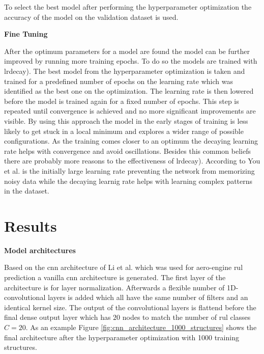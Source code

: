 \documentclass[conference]{IEEEtran}
\begin{document}
To select the best model after performing the hyperparameter optimization the accuracy of the model on the validation dataset is used.

\noindent
\textbf{Fine Tuning}

After the optimum parameters for a model are found the model can be further improved by running more training epochs. To do so the models are trained with \gls{lrdecay)}. The best model from the hyperparameter optimization is taken and trained for a predefined number of epochs on the learning rate which was identified as the best one on the optimization. The learning rate is then lowered before the model is trained again for a fixed number of epochs. This step is repeated until convergence is achieved and no more significant improvements are visible. By using this approach the model in the early stages of training is less likely to get stuck in a local minimum and explores a wider range of possible configurations. As the training comes closer to an optimum the decaying learning rate helps with convergence and avoid oscillations. Besides this common beliefs there are probably more reasons to the effectiveness of \gls{lrdecay)}. According to You et al. \cite{You2019} is the initially large learning rate preventing the network from memorizing noisy data while the decaying learnig rate helps with learning complex patterns in the dataset.


\section{Results}
\label{sec:results}


\noindent
\textbf{Model architectures}

Based on the \gls{cnn} architecture of Li et al. \cite{Li2018} which was used for aero-engine \gls{rul} prediction a vanilla \gls{cnn} architecture is generated. The first layer of the architecture is for layer normalization. Afterwards a flexible number of 1D-convolutional layers is added which all have the same number of filters and an identical kernel size. The output of the convolutional layers is flattend before the final dense output layer which has $ 20 $ nodes to match the number of \gls{rul} classes $ C = 20 $. As an example Figure \ref{fig:cnn_architecture_1000_structures} shows the final architecture after the hyperparameter optimization with 1000 training structures.
\end{document}
